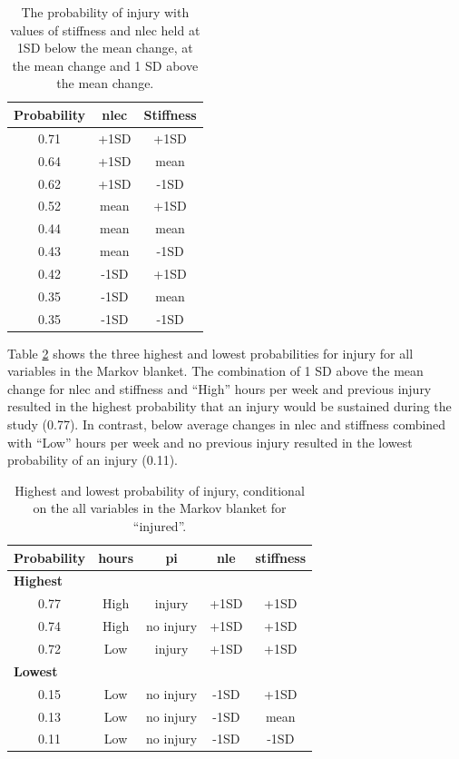 \documentclass[
  english,
  man,floatsintext]{apa6}
\begin{document}
\begin{table}[H]

\caption{\label{tab:table10}The probability of injury with values of stiffness and nlec held at 1SD below the mean change, at the mean change and 1 SD above the mean change.}
\centering
\begin{tabular}[t]{c|c|c}
\hline
\textbf{Probability} & \textbf{nlec} & \textbf{Stiffness}\\
\hline
0.71 & +1SD & +1SD\\
\hline
0.64 & +1SD & mean\\
\hline
0.62 & +1SD & -1SD\\
\hline
0.52 & mean & +1SD\\
\hline
0.44 & mean & mean\\
\hline
0.43 & mean & -1SD\\
\hline
0.42 & -1SD & +1SD\\
\hline
0.35 & -1SD & mean\\
\hline
0.35 & -1SD & -1SD\\
\hline
\end{tabular}
\end{table}

Table \ref{tab:table11} shows the three highest and lowest probabilities for injury for all variables in the Markov blanket.
The combination of 1 SD above the mean change for nlec and stiffness and ``High'' hours per week and previous injury resulted in the highest probability that an injury would be sustained during the study (0.77).
In contrast, below average changes in nlec and stiffness combined with ``Low'' hours per week and no previous injury resulted in the lowest probability of an injury (0.11).

\begin{table}[H]

\caption{\label{tab:table11}Highest and lowest probability of injury, conditional on the all variables in the Markov blanket for ``injured''.}
\centering
\begin{tabular}[t]{c|c|c|c|c}
\hline
\textbf{Probability} & \textbf{hours} & \textbf{pi} & \textbf{nle} & \textbf{stiffness}\\
\hline
\multicolumn{5}{l}{\textbf{Highest}}\\
\hline
\hspace{1em}0.77 & High & injury & +1SD & +1SD\\
\hline
\hspace{1em}0.74 & High & no injury & +1SD & +1SD\\
\hline
\hspace{1em}0.72 & Low & injury & +1SD & +1SD\\
\hline
\multicolumn{5}{l}{\textbf{Lowest}}\\
\hline
\hspace{1em}0.15 & Low & no injury & -1SD & +1SD\\
\hline
\hspace{1em}0.13 & Low & no injury & -1SD & mean\\
\hline
\hspace{1em}0.11 & Low & no injury & -1SD & -1SD\\
\hline
\end{tabular}
\end{table}
\end{document}
